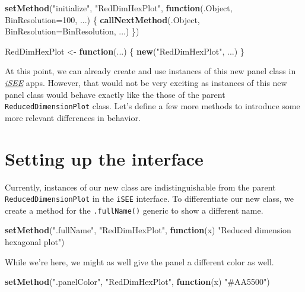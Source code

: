 \documentclass[
]{book}
\newenvironment{Shaded}{\begin{snugshade}}{\end{snugshade}}
\newcommand{\ControlFlowTok}[1]{\textcolor[rgb]{0.13,0.29,0.53}{\textbf{#1}}}
\newcommand{\DataTypeTok}[1]{\textcolor[rgb]{0.13,0.29,0.53}{#1}}
\newcommand{\DecValTok}[1]{\textcolor[rgb]{0.00,0.00,0.81}{#1}}
\newcommand{\KeywordTok}[1]{\textcolor[rgb]{0.13,0.29,0.53}{\textbf{#1}}}
\newcommand{\NormalTok}[1]{#1}
\newcommand{\StringTok}[1]{\textcolor[rgb]{0.31,0.60,0.02}{#1}}
\begin{document}
\begin{Shaded}
\begin{Highlighting}[]
\KeywordTok{setMethod}\NormalTok{(}\StringTok{"initialize"}\NormalTok{, }\StringTok{"RedDimHexPlot"}\NormalTok{,}
    \ControlFlowTok{function}\NormalTok{(.Object, }\DataTypeTok{BinResolution=}\DecValTok{100}\NormalTok{, ...)}
\NormalTok{\{}
    \KeywordTok{callNextMethod}\NormalTok{(.Object, }\DataTypeTok{BinResolution=}\NormalTok{BinResolution, ...)}
\NormalTok{\})}

\NormalTok{RedDimHexPlot <-}\StringTok{ }\ControlFlowTok{function}\NormalTok{(...) \{}
    \KeywordTok{new}\NormalTok{(}\StringTok{"RedDimHexPlot"}\NormalTok{, ...)}
\NormalTok{\}}
\end{Highlighting}
\end{Shaded}

At this point, we can already create and use instances of this new panel class in \emph{\href{https://bioconductor.org/packages/3.11/iSEE}{iSEE}} apps.
However, that would not be very exciting as instances of this new panel class would behave exactly like the those of the parent \texttt{ReducedDimensionPlot} class.
Let's define a few more methods to introduce some more relevant differences in behavior.

\hypertarget{setting-up-the-interface}{%
\section{Setting up the interface}\label{setting-up-the-interface}}

Currently, instances of our new class are indistinguishable from the parent \texttt{ReducedDimensionPlot} in the \texttt{iSEE} interface.
To differentiate our new class, we create a method for the \texttt{.fullName()} generic to show a different name.

\begin{Shaded}
\begin{Highlighting}[]
\KeywordTok{setMethod}\NormalTok{(}\StringTok{".fullName"}\NormalTok{, }\StringTok{"RedDimHexPlot"}\NormalTok{, }\ControlFlowTok{function}\NormalTok{(x) }\StringTok{"Reduced dimension hexagonal plot"}\NormalTok{)}
\end{Highlighting}
\end{Shaded}

While we're here, we might as well give the panel a different color as well.

\begin{Shaded}
\begin{Highlighting}[]
\KeywordTok{setMethod}\NormalTok{(}\StringTok{".panelColor"}\NormalTok{, }\StringTok{"RedDimHexPlot"}\NormalTok{, }\ControlFlowTok{function}\NormalTok{(x) }\StringTok{"#AA5500"}\NormalTok{)}
\end{Highlighting}
\end{Shaded}
\end{document}
